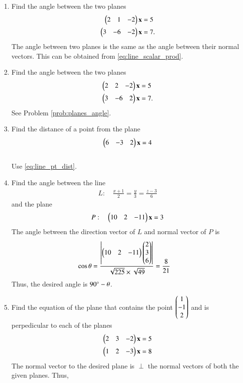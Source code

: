 \begin{enumerate}[label=\arabic*.,ref=\thesubsection.\theenumi]
\item Find the angle between the two planes
\label{prob:planes_angle}
\begin{align}
\begin{pmatrix}2 & 1 & -2\end{pmatrix}\mathbf{x}&=5
\\
\begin{pmatrix}3 &-6 & -2\end{pmatrix}\mathbf{x}&=7.
\end{align}
%
\solution The angle between two planes is the same as the angle between their normal vectors.  This can be obtained from \eqref{eq:line_scalar_prod}.

\item Find the angle between the two planes
\begin{align}
\begin{pmatrix}2 & 2 & -2\end{pmatrix}\mathbf{x}&=5
\\
\begin{pmatrix}3 &-6 & 2\end{pmatrix}\mathbf{x}&=7.
\end{align}
%
\solution See Problem \eqref{prob:planes_angle}.
%
\item Find the distance of a point  from the plane
\begin{align}
\begin{pmatrix}6 & -3 & 2\end{pmatrix}\mathbf{x}=4
\end{align}
%
\\
\solution Use \eqref{eq:line_pt_dist}.
\item Find the angle between the line 
%
\begin{align}
L: \quad \frac{x+1}{2} = \frac{y}{3} = \frac{z-3}{6} 
\end{align}
%
and
%
the plane 
\begin{align}
P: \quad \begin{pmatrix}10 & 2 & -11\end{pmatrix}\mathbf{x}=3
\end{align}
%
\label{prob:plane_angle_line}
%
\solution The angle between the direction vector of $L$ and normal vector of $P$ is 
%
\begin{align}
\cos \theta &= \frac{\left\vert\begin{pmatrix}10 & 2 & -11\end{pmatrix}\begin{pmatrix}2\\3\\6\end{pmatrix}\right\vert}{\sqrt{225}\times \sqrt{49}} = \frac{8}{21}
\end{align}
%
Thus, the desired angle is $90\degree -\theta$.
\item Find the equation of the plane that contains the point $\begin{pmatrix}1\\-1\\2\end{pmatrix}$ and is perpedicular to each of the planes
\begin{align}
\begin{pmatrix}2 & 3 & -2\end{pmatrix}\mathbf{x}&=5
\\
\begin{pmatrix}1 & 2 & -3\end{pmatrix}\mathbf{x}&=8
\end{align}
%
\solution The normal vector to the desired plane is $\perp$ the normal vectors of both the given planes.  Thus,

\end{enumerate}
